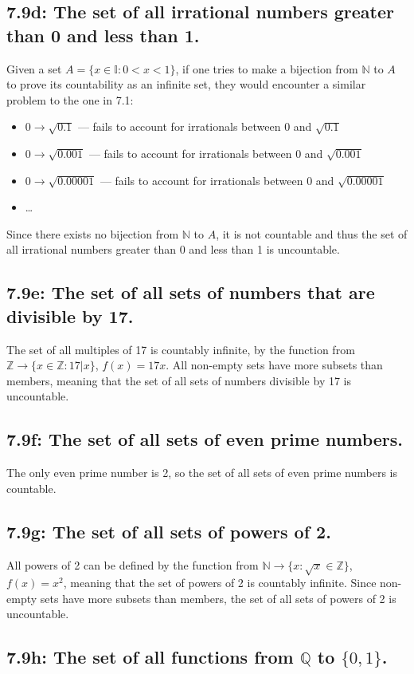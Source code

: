\documentclass{article}
\begin{document}
\subsection*{7.9d: The set of all irrational numbers greater than 0 and less than 1.}
Given a set $A=\{x\in \mathbb{I}:0<x<1\}$, if one tries to make a bijection from $\mathbb{N}$ to $A$ to prove its countability as an infinite set, they would encounter a similar problem to the one in 7.1:
\begin{itemize}
  \item $0\rightarrow \sqrt{0.1}$ --- fails to account for irrationals between 0 and $\sqrt{0.1}$
  \item $0\rightarrow \sqrt{0.001}$ --- fails to account for irrationals between 0 and $\sqrt{0.001}$
  \item $0\rightarrow \sqrt{0.00001}$ --- fails to account for irrationals between 0 and $\sqrt{0.00001}$
  \item \ldots
\end{itemize}
Since there exists no bijection from $\mathbb{N}$ to $A$, it is not countable and thus the set of all irrational numbers greater than 0 and less than 1 is uncountable.
\subsection*{7.9e: The set of all sets of numbers that are divisible by 17.}
The set of all multiples of 17 is countably infinite, by the function from $\mathbb{Z}\rightarrow\{x\in\mathbb{Z}:17|x\}$, $f(x)=17x$. All non-empty sets have more subsets than members, meaning that the set of all sets of numbers divisible by 17 is uncountable.
\subsection*{7.9f: The set of all sets of even prime numbers.}
The only even prime number is 2, so the set of all sets of even prime numbers is countable.
\subsection*{7.9g: The set of all sets of powers of 2.}
All powers of 2 can be defined by the function from $\mathbb{N}\rightarrow\{x:\sqrt{x}\in\mathbb{Z}\}$, $f(x)=x^2$, meaning that the set of powers of 2 is countably infinite. Since non-empty sets have more subsets than members, the set of all sets of powers of 2 is uncountable.
\subsection*{7.9h: The set of all functions from $\mathbb{Q}$ to $\{0,1\}$.}
\end{document}
